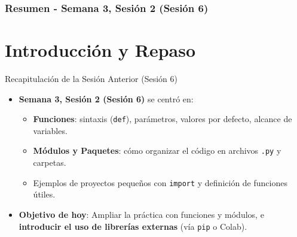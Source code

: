 \documentclass[10pt]{beamer}
\begin{document}
\myfront{}

\begin{frame}
  \titlepage
\end{frame}

\begin{frame}
  \frametitle{Resumen - Semana 3, Sesión 2 (Sesión 6)}
  \tableofcontents
\end{frame}


\section{Introducción y Repaso}

\begin{frame}{Recapitulación de la Sesión Anterior (Sesión 6)}
  \begin{itemize}
    \item \textbf{Semana 3, Sesión 2 (Sesión 6)} se centró en:
      \begin{itemize}
        \item \textbf{Funciones}: sintaxis (\texttt{def}), parámetros, valores por defecto, alcance de variables.
        \item \textbf{Módulos y Paquetes}: cómo organizar el código en archivos \texttt{.py} y carpetas.
        \item Ejemplos de proyectos pequeños con \texttt{import} y definición de funciones útiles.
      \end{itemize}
    \item \textbf{Objetivo de hoy}: Ampliar la práctica con funciones y módulos, e \textbf{introducir el uso de librerías externas} (vía \texttt{pip} o Colab).
  \end{itemize}
\end{frame}
\end{document}
